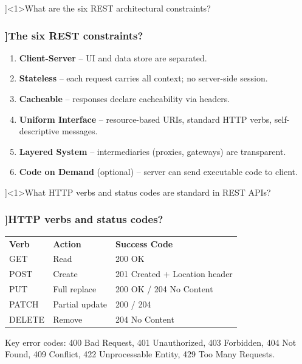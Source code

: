 
\QuestionSlide[\CategoryBadge[RestColor!20]{REST \& SignalR}]<1>{What are the six REST architectural constraints?}

\begin{frame}[fragile]
  \frametitle{\AnswerTitle[\CategoryBadge[RestColor!20]{REST \& SignalR}]{The six REST constraints?}}

  {\footnotesize
  \begin{enumerate}
    \item \textbf{Client-Server} – UI and data store are separated.
    \item \textbf{Stateless} – each request carries all context; no server-side session.
    \item \textbf{Cacheable} – responses declare cacheability via headers.
    \item \textbf{Uniform Interface} – resource-based URIs, standard HTTP verbs, self-descriptive messages.
    \item \textbf{Layered System} – intermediaries (proxies, gateways) are transparent.
    \item \textbf{Code on Demand} (optional) – server can send executable code to client.
  \end{enumerate}
  }
\end{frame}

\QuestionSlide[\CategoryBadge[RestColor!20]{REST \& SignalR}]<1>{What HTTP verbs and status codes are standard in REST APIs?}

\begin{frame}[fragile]
  \frametitle{\AnswerTitle[\CategoryBadge[RestColor!20]{REST \& SignalR}]{HTTP verbs and status codes?}}

  {\footnotesize
  \begin{tabular}{lll}
    \textbf{Verb} & \textbf{Action} & \textbf{Success Code} \\
    GET    & Read          & 200 OK \\
    POST   & Create        & 201 Created + Location header \\
    PUT    & Full replace  & 200 OK / 204 No Content \\
    PATCH  & Partial update & 200 / 204 \\
    DELETE & Remove        & 204 No Content \\
  \end{tabular}
  \vspace{0.5em}
  Key error codes: 400 Bad Request, 401 Unauthorized, 403 Forbidden, 404 Not Found, 409 Conflict, 422 Unprocessable Entity, 429 Too Many Requests.
  }
\end{frame}

